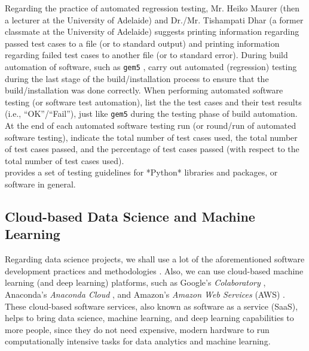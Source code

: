 \documentclass[letter,12pt]{article}
\begin{document}
Regarding the practice of automated regression testing, Mr. Heiko Maurer (then a lecturer at the University of Adelaide) and Dr./Mr. Tishampati Dhar (a former classmate at the University of Adelaide) suggests printing information regarding passed test cases to a file (or to standard output) and printing information regarding failed test cases to another file (or to standard error). During build automation of software, such as {\tt gem5} \cite{gem5developers2014,Binkert2011}, carry out automated (regression) testing during the last stage of the build/installation process to ensure that the build/installation was done correctly. When performing automated software testing (or software test automation), list the the test cases and their test results (i.e., ``OK''/``Fail''), just like {\tt gem5} during the testing phase of build automation. At the end of each automated software testing run (or round/run of automated software testing), indicate the total number of test cases used, the total number of test cases passed, and the percentage of test cases passed (with respect to the total number of test cases used). \\


\cite[\S Testing Guidelines]{TheSciPyCommunity2019c} provides a set of testing guidelines for *Python* libraries and packages, or software in general.





\subsection{Cloud-based Data Science and Machine Learning}
\label{ssec:CloudBasedDataScienceAndMachineLearning}

Regarding data science projects, we shall use a lot of the aforementioned software development practices and methodologies \cite{Cady2017}. Also, we can use cloud-based machine learning (and deep learning) platforms, such as Google's {\it Colaboratory} \cite{GoogleColabStaff2019}, Anaconda's {\it Anaconda Cloud} \cite{AnacondaStaff2019}, and Amazon's {\it Amazon Web Services} (AWS) \cite{AmazonWebServicesStaff2019}. These cloud-based software services, also known as software as a service (SaaS), helps to bring data science, machine learning, and deep learning capabilities to more people, since they do not need expensive, modern hardware to run computationally intensive tasks for data analytics and machine learning.
\end{document}
